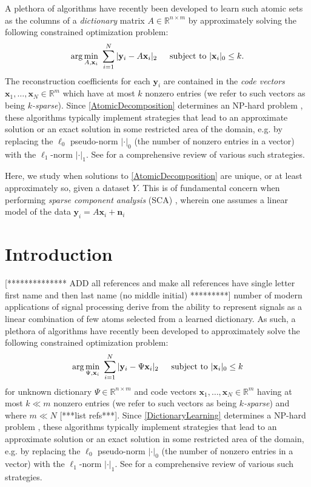 \documentclass[journal, onecolumn]{IEEEtran}
\begin{document}
A plethora of algorithms have recently been developed to learn such atomic sets as the columns of a \emph{dictionary} matrix $A \in \mathbb{R}^{n \times m}$ by approximately solving the following constrained optimization problem:
\begin{align}\label{DictionaryLearning}
\arg \min_{A, \mathbf{x}_i} \  \sum_{i=1}^N |\mathbf{y}_i - A\mathbf{x}_i|_2 \indent \text{subject to } |\mathbf{x}_i|_0 \leq k.
\end{align}
%
The reconstruction coefficients for each $\mathbf{y}_i$ are contained in the \emph{code vectors} $\mathbf{x}_1, \ldots, \mathbf{x}_N \in \mathbb{R}^m$ which have at most $k$ nonzero entries (we refer to such vectors as being \emph{$k$-sparse}). Since \eqref{AtomicDecomposition} determines an NP-hard problem \cite{Tillmann15}, these algorithms typically implement strategies that lead to an approximate solution or an exact solution in some restricted area of the domain, e.g. by replacing the $\ell_0$ pseudo-norm $|\cdot|_0$ (the number of nonzero entries in a vector) with the $\ell_1$-norm $|\cdot|_1$. See \cite{Zhang15} for a comprehensive review of various such strategies. 

Here, we study when solutions to \eqref{AtomicDecomposition} are unique, or at least approximately so, given a dataset $Y$. This is of fundamental concern when performing \emph{sparse component analysis} (SCA) \cite{Georgiev05}, wherein one assumes a linear model of the data $\mathbf{y}_i = A\mathbf{x}_i + \mathbf{n}_i$ 

\section{Introduction}
[************** ADD all references and make all references have single letter first name and then last name (no middle initial) *********]
 number of modern applications of signal processing derive from the ability to represent signals as a linear combination of few atoms selected from a learned dictionary. As such, a plethora of algorithms have recently been developed to approximately solve the following constrained optimization problem:
\begin{align}\label{DictionaryLearning}
\arg \min_{\Psi, \mathbf{x}_i} \  \sum_{i=1}^N |\mathbf{y}_i - \Psi\mathbf{x}_i|_2 \indent \text{subject to } |\mathbf{x}_i|_0 \leq k
\end{align}
%
for unknown dictionary $\Psi \in \mathbb{R}^{n \times m}$ and code vectors $\mathbf{x}_1, \ldots, \mathbf{x}_N \in \mathbb{R}^m$ having at most $k \ll m$ nonzero entries (we refer to such vectors as being \emph{$k$-sparse}) and where $m \ll N$ [***list refs***]. Since \eqref{DictionaryLearning} determines a NP-hard problem \cite{Tillmann15}, these algorithms typically implement strategies that lead to an approximate solution or an exact solution in some restricted area of the domain, e.g. by replacing the $\ell_0$ pseudo-norm $|\cdot|_0$ (the number of nonzero entries in a vector) with the $\ell_1$-norm $|\cdot|_1$. See \cite{Zhang15} for a comprehensive review of various such strategies. 
\end{document}
